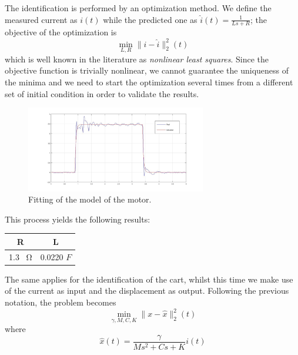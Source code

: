 The identification is performed by an optimization method. We define the measured current as $i(t)$ while the predicted one as $\hat{i}(t) = \frac{1}{Ls+R}$; the objective of the optimization is
\begin{equation}
\min_{L,R} \|i-\hat{i}\|_2^2(t)
\end{equation}
which is well known in the literature as \emph{nonlinear least squares}. Since the objective function is trivially nonlinear, we cannot guarantee the uniqueness of the minima and we need to start the optimization several times from a different set of initial condition in order to validate the results.\\

\begin{figure}[h]
\centering
\includegraphics[width=0.7\textwidth]{img/graybox_motor.jpg}
\caption{Fitting of the model of the motor.}
\end{figure}

This process yields the following results:\\

\begin{table}[h]
\centering
\begin{tabular}{|c|c|}
R & L \\
\hline
1.3 \SI{}{\ohm}  & 0.0220 $F$ \\
\end{tabular}
\end{table}

The same applies for the identification of the cart, whilst this time we make use of the current as input and the displacement as output. Following the previous notation, the problem becomes
\begin{equation}
\min_{\gamma,M,C,K} \|x-\hat{x}\|_2^2(t)
\end{equation}
where
\begin{equation}
\hat{x}(t) = \frac{\gamma}{Ms^2+Cs+K} i(t)
\end{equation}

